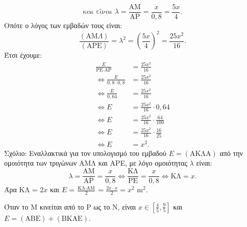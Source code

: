 \begin{alist}
\begin{rlist}
\begin{figure}
\end{figure}
\[ \text{και είναι } \lambda = \frac{\text{AM}}{\text{AP}} = \frac{x}{0,8} = \frac{5x}{4}. \]
Οπότε ο λόγος των εμβαδών τους είναι:
\[ \frac{(\text{AM}\Lambda)}{(\text{APE})} = \lambda^2 = \left(\frac{5x}{4}\right)^2 = \frac{25x^2}{16}. \]
Έτσι έχουμε:
\begin{align*} \frac{E}{\text{PE} \cdot \text{AP}} &= \frac{25x^2}{16} \\ \Leftrightarrow \frac{E}{0,8 \cdot 0,8} &= \frac{25x^2}{16} \\ \Leftrightarrow \frac{E}{0,64} &= \frac{25x^2}{16} \\ \Leftrightarrow E &= \frac{25x^2}{16} \cdot 0,64 \\ \Leftrightarrow E &= \frac{25x^2}{16} \cdot \frac{64}{100} \\ \Leftrightarrow E &= \frac{25x^2}{16} \cdot \frac{16}{25} \\ \Leftrightarrow E &= x^2. \end{align*}
Σχόλιο: Εναλλακτικά για τον υπολογισμό του εμβαδού $E = (\text{AKΛA})$ από την ομοιότητα των τριγώνων ΑΜΛ και ΑΡΕ, με λόγο ομοιότητας $\lambda$ είναι:
\[ \lambda = \frac{\text{AM}}{\text{AP}} = \frac{x}{0,8} \Leftrightarrow \frac{\text{ΚΛ}}{\text{PE}} = \frac{x}{0,8} \Leftrightarrow \text{ΚΛ} = x. \]
Άρα ΚΛ = $2x$ και $E = \frac{\text{ΚΛ} \cdot \text{AM}}{2} = \frac{2x \cdot x}{2} = x^2 \text{ m}^2$.

\item Όταν το Μ κινείται από το P ως το N, είναι $x \in \left[\frac{4}{5}, \frac{9}{5}\right]$ και $E=(\text{ABE}) + (\text{BKAE})$.
\begin{figure} %
\end{figure}
\end{rlist}
\end{alist}
